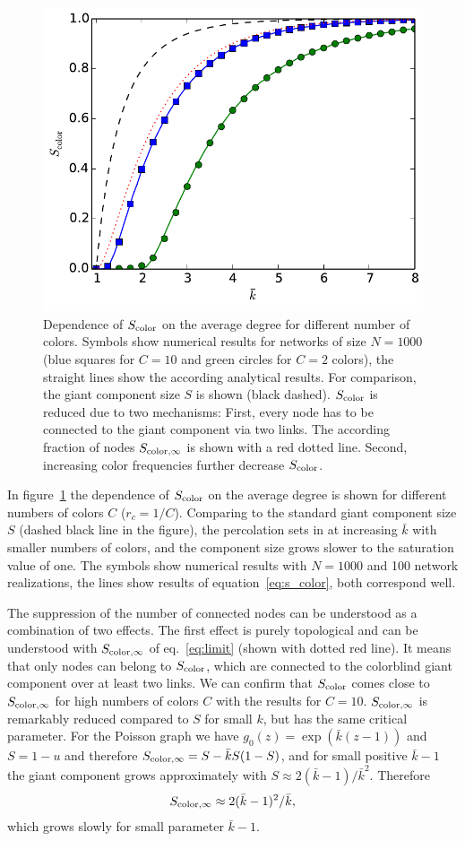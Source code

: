 \documentclass[aps, pre, onecolumn, a4paper, floatfix]{revtex4}
\begin{document}
\begin{figure}[htb]
\begin{center}
	\includegraphics[width=0.5\columnwidth]{S_color_poisson.pdf}
	\caption{Dependence of $S_{\rm color}$ on the average degree for different number of colors. 
	Symbols show numerical results for networks of size $N=1000$ 
	(blue squares for $C=10$ and green circles for $C=2$ colors), 
	the straight lines show the according analytical results. For comparison, 
	the giant component size $S$ is shown (black dashed). $S_{\rm color}$ is reduced due to two mechanisms: First, 
	every node has to be connected to the giant component via two links. The according fraction of 
	nodes $S_{{\rm color},\infty}$ is shown with a red dotted line. Second, increasing color frequencies 
	further decrease $S_{\rm color}$.}
	\label{fig:poisson}
\end{center}
\end{figure}

In figure~\ref{fig:poisson} the dependence of $S_{\rm color}$ on the average degree is shown for different numbers 
of colors $C$ ($r_c=1/C$). Comparing to the standard giant component size $S$ (dashed black line in the figure), 
the percolation sets in at increasing $\bar k$ with smaller numbers of colors, and the component size grows 
slower to the saturation value of one. The symbols show numerical results with $N=1000$ and 100 network realizations, 
the lines show results of equation~\ref{eq:s_color}, both correspond well. 

The suppression of the number of connected nodes can be understood as a combination of two effects. 
The first effect is purely topological and can be understood with $S_{{\rm color},\infty}$ of eq.~\ref{eq:limit}
(shown with dotted red line). It means that only nodes can belong to $S_{\rm color}$, which are connected 
to the colorblind giant component over at least two links. We can confirm that 
$S_{\rm color}$ comes close to $S_{{\rm color},\infty}$ for high numbers of colors $C$ with the results for $C=10$.
$S_{{\rm color},\infty}$ is remarkably reduced compared to $S$ for small $k$, but has the same critical parameter. 
For the Poisson graph we have $g_0(z)=\exp({\bar k}(z-1))$ and $S=1-u$ and therefore 
$S_{\rm color,\infty}=S-{\bar k} S (1-S)$, and for small positive ${\bar k}-1$ 
the giant component grows approximately with $S\approx 2 ({\bar k}-1)/{\bar k}^2$. Therefore
\begin{align}
S_{\rm color,\infty}\approx 2({\bar k}-1)^2/\bar k,
\end{align}
which grows slowly for small parameter ${\bar k}-1$. 
\end{document}
